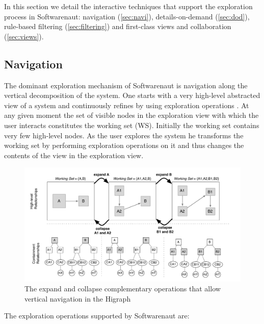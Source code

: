 \documentclass[preprint,12pt]{elsarticle}
\begin{document}
In this section we detail the interactive techniques that support the exploration process in Softwarenaut: navigation (\ref{sec:navi}), details-on-demand (\ref{sec:dod}), rule-based filtering (\ref{sec:filtering}) and first-class views and collaboration (\ref{sec:views}).  

\subsection{Navigation} 

The dominant exploration mechanism of Softwarenaut is navigation along the vertical decomposition of the system. One starts with a very high-level abstracted view of a system and continuously refines by using exploration operations \cite{robertson-conetrees}. At any given moment the set of visible nodes in the exploration view with which the user interacts constitutes the working set (WS). Initially the working set contains very few high-level nodes. As the user explores the system he transforms the working set by performing exploration operations on it and thus changes the contents of the view in the exploration view.

\begin{figure}[ht]
\begin{center}
\includegraphics[width=\linewidth]{SnautSequence}
\caption{The expand and collapse complementary operations that allow vertical navigation in the Higraph}
\label{}
\end{center}
\end{figure}

The exploration operations supported by Softwarenaut are:
\end{document}
